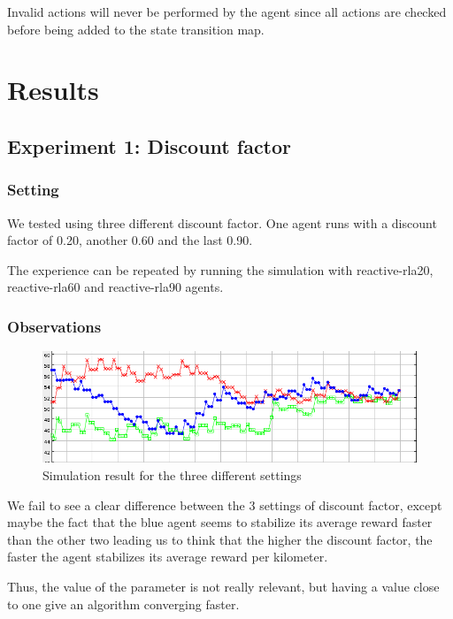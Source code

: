 \documentclass[11pt]{article}
\begin{document}
Invalid actions will never be performed by the agent since all actions
are checked before being added to the state transition map.

\section{Results}

\subsection{Experiment 1: Discount factor}

\subsubsection{Setting}
We tested using three different discount factor. One agent runs with a
discount factor of 0.20, another 0.60 and the last 0.90.

The experience can be repeated by running the simulation with
reactive-rla20, reactive-rla60 and reactive-rla90 agents.

\subsubsection{Observations}
\begin{figure}
  \caption{Simulation result for the three different settings}
  \includegraphics[scale=0.7]{compare_discount}
  \centering
\end{figure}

We fail to see a clear difference between the 3 settings of discount
factor, except maybe the fact that the blue agent seems to stabilize
its average reward faster than the other two leading us to think that
the higher the discount factor, the faster the agent stabilizes its
average reward per kilometer.

Thus, the value of the parameter is not really relevant, but having a value
close to one give an algorithm converging faster.
\end{document}
